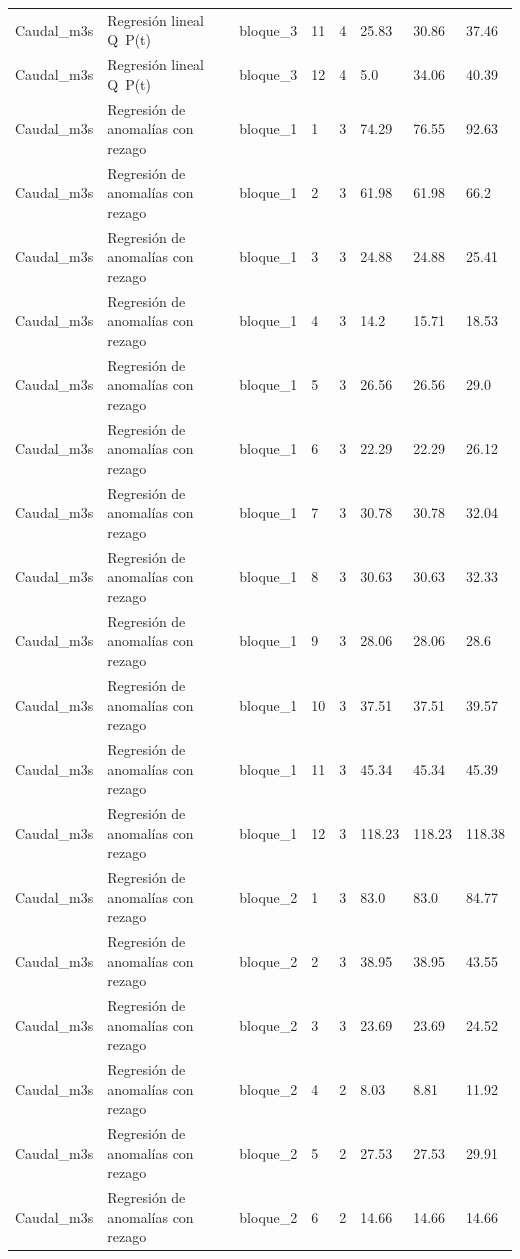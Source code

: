 \begin{longtable}{llllllll}
Caudal\_m3s & Regresión lineal Q~P(t) & bloque\_3 & 11 & 4 & 25.83 & 30.86 & 37.46 \\
Caudal\_m3s & Regresión lineal Q~P(t) & bloque\_3 & 12 & 4 & 5.0 & 34.06 & 40.39 \\
Caudal\_m3s & Regresión de anomalías con rezago & bloque\_1 & 1 & 3 & 74.29 & 76.55 & 92.63 \\
Caudal\_m3s & Regresión de anomalías con rezago & bloque\_1 & 2 & 3 & 61.98 & 61.98 & 66.2 \\
Caudal\_m3s & Regresión de anomalías con rezago & bloque\_1 & 3 & 3 & 24.88 & 24.88 & 25.41 \\
Caudal\_m3s & Regresión de anomalías con rezago & bloque\_1 & 4 & 3 & 14.2 & 15.71 & 18.53 \\
Caudal\_m3s & Regresión de anomalías con rezago & bloque\_1 & 5 & 3 & 26.56 & 26.56 & 29.0 \\
Caudal\_m3s & Regresión de anomalías con rezago & bloque\_1 & 6 & 3 & 22.29 & 22.29 & 26.12 \\
Caudal\_m3s & Regresión de anomalías con rezago & bloque\_1 & 7 & 3 & 30.78 & 30.78 & 32.04 \\
Caudal\_m3s & Regresión de anomalías con rezago & bloque\_1 & 8 & 3 & 30.63 & 30.63 & 32.33 \\
Caudal\_m3s & Regresión de anomalías con rezago & bloque\_1 & 9 & 3 & 28.06 & 28.06 & 28.6 \\
Caudal\_m3s & Regresión de anomalías con rezago & bloque\_1 & 10 & 3 & 37.51 & 37.51 & 39.57 \\
Caudal\_m3s & Regresión de anomalías con rezago & bloque\_1 & 11 & 3 & 45.34 & 45.34 & 45.39 \\
Caudal\_m3s & Regresión de anomalías con rezago & bloque\_1 & 12 & 3 & 118.23 & 118.23 & 118.38 \\
Caudal\_m3s & Regresión de anomalías con rezago & bloque\_2 & 1 & 3 & 83.0 & 83.0 & 84.77 \\
Caudal\_m3s & Regresión de anomalías con rezago & bloque\_2 & 2 & 3 & 38.95 & 38.95 & 43.55 \\
Caudal\_m3s & Regresión de anomalías con rezago & bloque\_2 & 3 & 3 & 23.69 & 23.69 & 24.52 \\
Caudal\_m3s & Regresión de anomalías con rezago & bloque\_2 & 4 & 2 & 8.03 & 8.81 & 11.92 \\
Caudal\_m3s & Regresión de anomalías con rezago & bloque\_2 & 5 & 2 & 27.53 & 27.53 & 29.91 \\
Caudal\_m3s & Regresión de anomalías con rezago & bloque\_2 & 6 & 2 & 14.66 & 14.66 & 14.66 \\

\end{longtable}
